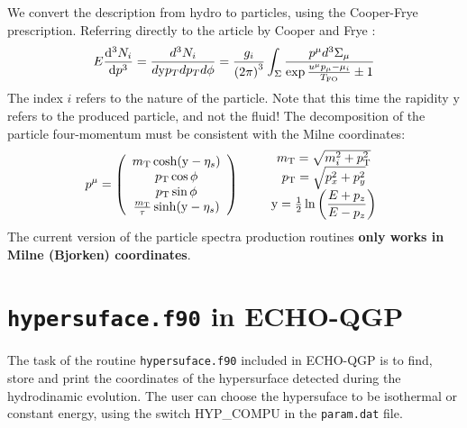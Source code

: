 We convert the description from hydro to particles, using the Cooper-Frye 
prescription.
Referring directly to the article by Cooper and Frye \cite{Cooper1974}:
\begin{align}
 E\dfrac{\mathrm{d}^3N_i}{\mathrm{d} p^3}=\dfrac{d^3N_i}{d	\mathrm{y} p_Tdp_Td\phi}=
\dfrac{g_i}{{(2\pi)}^3}\int_\Sigma{ \dfrac{p^\mu d^3\Sigma_\mu}
{\exp{\frac{u^\mu p_\mu-\mu_i}{T_{\mathrm{FO}}}}\pm 1}}
\label{eq:cooperfrye}
\end{align}
The index $i$ refers to the nature of the particle. Note that this time the 
rapidity $\mathrm{y}$ refers to the produced particle, and not the fluid! 
The decomposition of the particle four-momentum must be consistent with the 
Milne coordinates:
\begin{align}
p^\mu= \left(\begin{array}[c]{c}
m_\mathrm{T} \cosh(\mathrm{y}-\eta_s) 	\\
p_\mathrm{T} \cos\phi			\\
p_\mathrm{T} \sin\phi			\\
\frac{m_\mathrm{T}}{\tau}\sinh(\mathrm{y}-\eta_s)
\end{array}\right) \qquad 
\begin{array}[c]{c}
m_\mathrm{T} = \sqrt{m_i^2 + p_\mathrm{T}^2}\\
p_\mathrm{T}= \sqrt{p_x^2 + p_y^2}\\
\mathrm{y}= \frac{1}{2} \ln\left(\dfrac{E+p_z}{E-p_z}\right)
\end{array}
\label{eq:momentum}
\end{align}
The current version of the particle spectra production routines \textbf{only works in Milne (Bjorken) coordinates}.

\section{{\tt hypersuface.f90} in ECHO-QGP} \label{sec:hysu}
The task of the routine {\tt hypersuface.f90} included in ECHO-QGP is to find, 
store and print the coordinates of the hypersurface detected during the
hydrodinamic evolution. The user can choose the hypersuface to be isothermal or constant energy, using the switch HYP\_COMPU in the {\tt param.dat} file.

